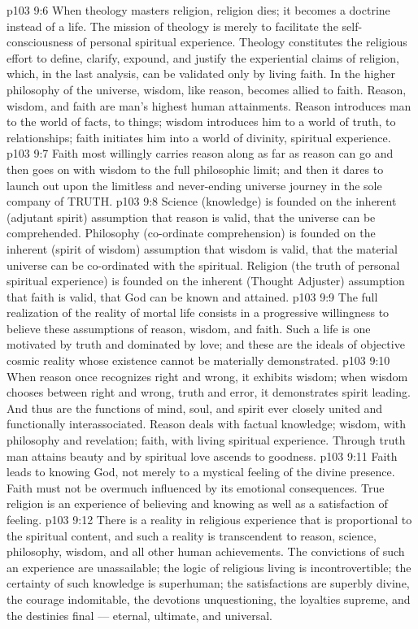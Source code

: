 \vs p103 9:6 \pc When theology masters religion, religion dies; it becomes a doctrine instead of a life. The mission of theology is merely to facilitate the self\hyp{}consciousness of personal spiritual experience. Theology constitutes the religious effort to define, clarify, expound, and justify the experiential claims of religion, which, in the last analysis, can be validated only by living faith. In the higher philosophy of the universe, wisdom, like reason, becomes allied to faith. Reason, wisdom, and faith are man’s highest human attainments. Reason introduces man to the world of facts, to things; wisdom introduces him to a world of truth, to relationships; faith initiates him into a world of divinity, spiritual experience.
\vs p103 9:7 Faith most willingly carries reason along as far as reason can go and then goes on with wisdom to the full philosophic limit; and then it dares to launch out upon the limitless and never\hyp{}ending universe journey in the sole company of TRUTH.
\vs p103 9:8 \pc Science (knowledge) is founded on the inherent (adjutant spirit) assumption that reason is valid, that the universe can be comprehended. Philosophy (co\hyp{}ordinate comprehension) is founded on the inherent (spirit of wisdom) assumption that wisdom is valid, that the material universe can be co\hyp{}ordinated with the spiritual. Religion (the truth of personal spiritual experience) is founded on the inherent (Thought Adjuster) assumption that faith is valid, that God can be known and attained.
\vs p103 9:9 The full realization of the reality of mortal life consists in a progressive willingness to believe these assumptions of reason, wisdom, and faith. Such a life is one motivated by truth and dominated by love; and these are the ideals of objective cosmic reality whose existence cannot be materially demonstrated.
\vs p103 9:10 When reason once recognizes right and wrong, it exhibits wisdom; when wisdom chooses between right and wrong, truth and error, it demonstrates spirit leading. And thus are the functions of mind, soul, and spirit ever closely united and functionally interassociated. Reason deals with factual knowledge; wisdom, with philosophy and revelation; faith, with living spiritual experience. Through truth man attains beauty and by spiritual love ascends to goodness.
\vs p103 9:11 Faith leads to knowing God, not merely to a mystical feeling of the divine presence. Faith must not be overmuch influenced by its emotional consequences. True religion is an experience of believing and knowing as well as a satisfaction of feeling.
\vs p103 9:12 \pc There is a reality in religious experience that is proportional to the spiritual content, and such a reality is transcendent to reason, science, philosophy, wisdom, and all other human achievements. The convictions of such an experience are unassailable; the logic of religious living is incontrovertible; the certainty of such knowledge is superhuman; the satisfactions are superbly divine, the courage indomitable, the devotions unquestioning, the loyalties supreme, and the destinies final --- eternal, ultimate, and universal.
